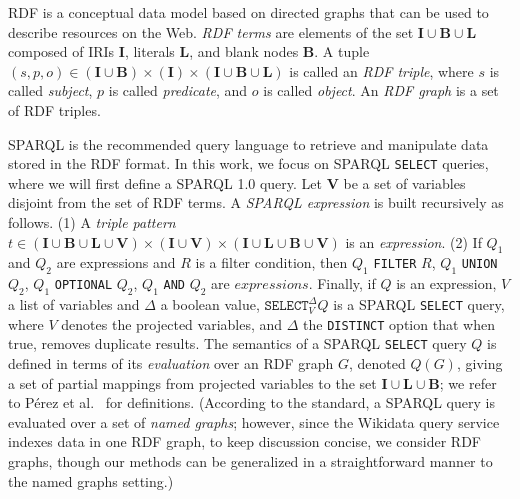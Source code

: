 \documentclass[runningheads]{llncs}
\newcommand{\Iris}{\ensuremath{\mathbf{I}}}
\newcommand{\Lits}{\ensuremath{\mathbf{L}}}
\newcommand{\Bnodes}{\ensuremath{\mathbf{B}}}
\newcommand{\Vars}{\ensuremath{\mathbf{V}}}
\begin{document}
RDF is a conceptual data model based on directed graphs that can be used to describe resources on the Web. \emph{RDF terms} are elements of the set $\Iris \cup \Bnodes \cup \Lits$ composed of IRIs $\Iris$, literals $\Lits$, and blank nodes $\Bnodes$. A tuple $ (s, p, o) \in (\Iris \cup  \Bnodes)  \times (\Iris)  \times  (\Iris \cup \Bnodes \cup  \Lits)$  is called an \emph{RDF triple}, where $s$ is called \emph{subject}, $p$ is called \emph{predicate}, and $o$ is called \emph{object}. An \emph{RDF graph} is a set of RDF triples.

SPARQL is the recommended query language to retrieve and manipulate data stored in the RDF format. In this work, we focus on SPARQL \texttt{SELECT} queries, where we will first define a SPARQL 1.0 query. Let $\Vars$ be a set of variables disjoint from the set of RDF terms. A \emph{SPARQL expression} is built recursively as follows. (1) A \emph{triple pattern} $t \in  (\Iris \cup \Bnodes \cup \Lits \cup \Vars) \times (\Iris \cup \Vars) \times (\Iris \cup \Lits \cup \Bnodes \cup \Vars)$ is an \emph{expression}. (2) If $Q_1$ and $Q_2$ are expressions and $R$ is a filter condition, then $Q_1$ \texttt{FILTER} $R$, $Q_1$ \texttt{UNION} $Q_2$, $Q_1$ \texttt{OPTIONAL} $Q_2$, $Q_1$ \texttt{AND} $Q_2$ are $expressions$. Finally, if $Q$ is an expression, $V$ a list of variables and $\Delta$ a boolean value, $\texttt{SELECT}_V^\Delta Q$ is a SPARQL \texttt{SELECT} query, where $V$ denotes the projected variables, and $\Delta$ the \texttt{DISTINCT} option that when true, removes duplicate results. The semantics of a SPARQL \texttt{SELECT} query $Q$ is defined in terms of its \emph{evaluation} over an RDF graph $G$, denoted $Q(G)$, giving a set of partial mappings from projected variables to the set $\Iris \cup \Lits \cup \Bnodes$; we refer to P{\'{e}}rez et al.~\cite{PerezAG09} for definitions. (According to the standard, a SPARQL query is evaluated over a set of \emph{named graphs}; however, since the Wikidata query service indexes data in one RDF graph, to keep discussion concise, we consider RDF graphs, though our methods can be generalized in a straightforward manner to the named graphs setting.)
\end{document}

